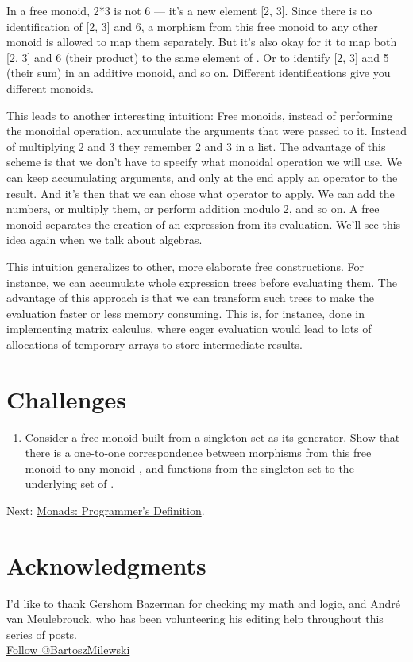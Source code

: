 In a free monoid, 2*3 is not 6 --- it's a new element {[}2, 3{]}. Since
there is no identification of {[}2, 3{]} and 6, a morphism from this
free monoid to any other monoid  is allowed to map them
separately. But it's also okay for it to map both {[}2, 3{]} and 6
(their product) to the same element of . Or to identify {[}2,
3{]} and 5 (their sum) in an additive monoid, and so on. Different
identifications give you different monoids.

This leads to another interesting intuition: Free monoids, instead of
performing the monoidal operation, accumulate the arguments that were
passed to it. Instead of multiplying 2 and 3 they remember 2 and 3 in a
list. The advantage of this scheme is that we don't have to specify what
monoidal operation we will use. We can keep accumulating arguments, and
only at the end apply an operator to the result. And it's then that we
can chose what operator to apply. We can add the numbers, or multiply
them, or perform addition modulo 2, and so on. A free monoid separates
the creation of an expression from its evaluation. We'll see this idea
again when we talk about algebras.

This intuition generalizes to other, more elaborate free constructions.
For instance, we can accumulate whole expression trees before evaluating
them. The advantage of this approach is that we can transform such trees
to make the evaluation faster or less memory consuming. This is, for
instance, done in implementing matrix calculus, where eager evaluation
would lead to lots of allocations of temporary arrays to store
intermediate results.

\section{Challenges}\label{challenges}

\begin{enumerate}
\tightlist
\item
  Consider a free monoid built from a singleton set as its generator.
  Show that there is a one-to-one correspondence between morphisms from
  this free monoid to any monoid , and functions from the
  singleton set to the underlying set of .
\end{enumerate}

Next:
\href{https://bartoszmilewski.com/2016/11/21/monads-programmers-definition/}{Monads:
Programmer's Definition}.

\section{Acknowledgments}\label{acknowledgments}

I'd like to thank Gershom Bazerman for checking my math and logic, and
André van Meulebrouck, who has been volunteering his editing help
throughout this series of posts.\\
\href{https://twitter.com/BartoszMilewski}{Follow @BartoszMilewski}
